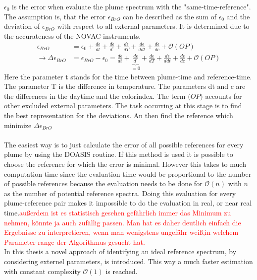 \documentclass  [
  paper    = a4,
  BCOR     = 10mm,
  twoside,
  fontsize = 12pt,
  fleqn,
  toc      = bibnumbered,
  toc      = listofnumbered,
  numbers  = noendperiod,
  headings = normal,
  listof   = leveldown,
  version  = 3.03
]                                       {scrreprt}
\begin{document}
	$\epsilon_{0}$ is the  error when evaluate the plume spectrum with the "same-time-reference".
	The assumption is, that the  error $\epsilon_{BrO}$ can be described as the sum of $\epsilon_{0}$ and the deviation of $\epsilon_{BrO}$ with respect to all external parameters. It is determined due to the accurateness of the NOVAC-instruments.
	\begin{align}
		\epsilon_{BrO} &=  \epsilon_{0}+\frac{d\epsilon}{dt}+\frac{d\epsilon}{d ^{\circ}}+\frac{d\epsilon}{dT}+\frac{d\epsilon}{ddt} +\frac{d\epsilon}{dc} + \mathcal{O}\left(OP\right) \\
		\rightarrow \Delta \epsilon_{BrO} &= \epsilon_{BrO} - \epsilon_{0} =\frac{d\epsilon}{dt}+\underbrace{\frac{d\epsilon}{d ^{\circ}}}_{=0}+\frac{d\epsilon}{dT}+\frac{d\epsilon}{ddt} +\frac{d\epsilon}{dc} + \mathcal{O}\left(OP\right) 
		\label{calc:err}
	\end{align}
	Here the parameter t stands for the time between plume-time and reference-time. The parameter T is the difference in temperature. The parameters dt and c are the differences in the daytime and the colorindex. The term $\mathcal(OP)$ accounts for other excluded external parameters.
	The task occurring at this stage is to find the best representation for the deviations. An then find the reference which minimize $\Delta \epsilon_{BrO} $\\
	\\
	The easiest way is to just calculate the  error of all possible references for every plume by using the DOASIS routine. If this method is used it is possible to choose the reference for which the  error is minimal. However this takes to much computation time since the evaluation time would be proportional to the number of possible references because the evaluation needs to be done for $\mathcal{O}(n)$ with $n$ as the number of potential reference spectra. Doing this evaluation for every plume-reference pair makes it impossible to do the evaluation in real, or near real time.\textcolor{red}{außerdem ist es statistisch gesehen gefährlich immer das Minimum zu nehmen, könnte ja auch zufällig passen. Man hat es daher deutlich einfach die Ergebnisse zu interpretieren, wenn man wenigstens ungefähr weiß,in welchem Parameter range der Algorithmus gesucht hat.}\\
	In this thesis a novel approach of identifying an ideal reference spectrum, by considering externel parameters, is introduced. This way a much faster estimation with constant complexity $\mathcal{O}(1)$ is reached.
\end{document}
